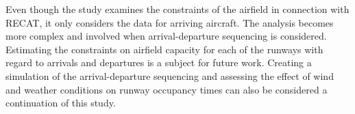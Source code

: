 Even though the study examines the constraints of the airfield in connection with RECAT, it only considers the data for arriving aircraft. The analysis becomes more complex and involved when arrival-departure sequencing is considered. Estimating the constraints on airfield capacity for each of the runways with regard to arrivals and departures is a subject for future work. Creating a simulation of the arrival-departure sequencing and assessing the effect of wind and weather conditions on runway occupancy times can also be considered a continuation of this study.



